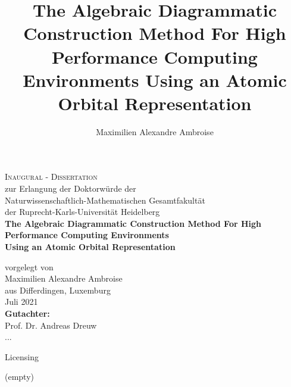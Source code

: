 \documentclass[a4paper,12pt]{report}
\begin{document}
\author{Maximilien Alexandre Ambroise}
\title{The Algebraic Diagrammatic Construction Method For High Performance Computing Environments Using an Atomic Orbital Representation}

\begin{titlepage}
\begin{center}
{\Huge\scshape Inaugural - Dissertation \\}
{ zur Erlangung der Doktorwürde der \\
Naturwissenschaftlich-Mathematischen Gesamtfakultät \\
der Ruprecht-Karls-Universität Heidelberg \\}
\vspace{1cm}
{\huge\bfseries The Algebraic Diagrammatic Construction Method For High Performance Computing Environments \\}
{\Large\bfseries Using an Atomic Orbital Representation \\}
 
\vspace{1.5cm}
{vorgelegt von\\}
\vspace*{1.5cm}
{\Large Maximilien Alexandre Ambroise}\\
{\large aus Differdingen, Luxemburg}\\
\vspace{2cm}
{Juli 2021} \\[5pt]
\vspace{2cm}
{\bfseries Gutachter: \\}
{Prof. Dr. Andreas Dreuw \\ ...}\\
\end{center}
\end{titlepage}


\newpage

Licensing

\newpage

(empty)

\newpage

\end{document}
